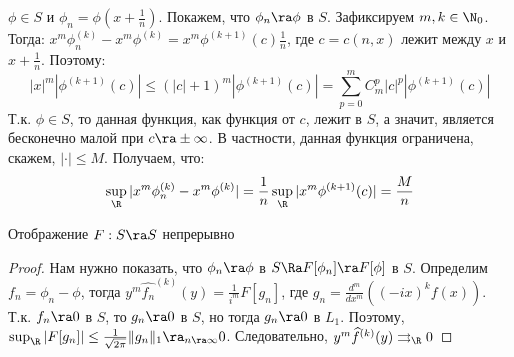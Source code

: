 \begin{example}
    \(\phi \in S\) и \(\phi_n = \phi\left( x + \frac{1}{n} \right)\). Покажем, что \(\phi_n \ra \phi\) в \(S\). Зафиксируем \(m, k \in \N_0\). Тогда: \(x^m\phi_n^{(k)} - x^m\phi^{(k)} = x^m\phi^{(k + 1)}(c)\frac{1}{n}\), где \(c = c(n, x)\) лежит между \(x\) и \(x + \frac{1}{n}\). Поэтому:
    \[|x|^m|\phi^{(k + 1)}(c)| \le \left( |c| + 1 \right)^m\left| \phi^{(k + 1)}(c) \right| = \sum_{p = 0}^m C_m^p|c|^p|\phi^{(k + 1)}(c)|\]
    Т.к. \(\phi \in S\), то данная функция, как функция от \(c\), лежит в \(S\), а значит, является бесконечно малой при \(c \ra \pm\infty\). В частности, данная функция ограничена, скажем, \(|\cdot| \le M\). Получаем, что:
    \[\sup_{\R}|x^m\phi_n^{(k)} - x^m\phi^{(k)}| = \frac{1}{n}\sup_{\R}|x^m\phi^{(k + 1)}(c)| = \frac{M}{n}\]
\end{example}

\begin{theorem}
    Отображение \(F: S \ra S\) непрерывно
\end{theorem}
\begin{proof}
    Нам нужно показать, что \(\phi_n \ra \phi\) в \(S \Ra F[\phi_n] \ra F[\phi]\) в \(S\). Определим \(f_n = \phi_n - \phi\), тогда \(y^m \widehat{f_n}^{(k)}(y) = \frac{1}{i^m}F[g_n]\), где \(g_n = \frac{d^m}{dx^m}((-ix)^kf(x))\). Т.к. \(f_n \ra 0\) в \(S\), то \(g_n \ra 0\) в \(S\), но тогда \(g_n \ra 0\) в \(L_1\). Поэтому, \(\sup_{\R}|F[g_n]| \le \frac{1}{\sqrt{2\pi}}\|g_n\|_1 \ra_{n \ra \infty} 0\). Следовательно, \(y^m\widehat{f}^{(k)}(y) \rightrightarrows_\R 0\)
\end{proof}

